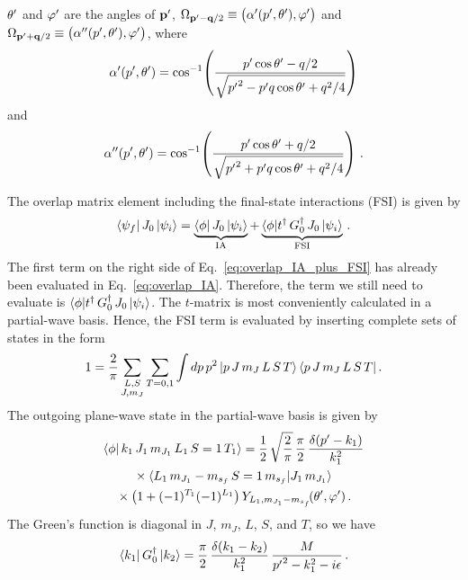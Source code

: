 	$\theta^{\prime}$ and $\varphi^{\prime}$ are the angles of $\mathbf{p^\prime}$, $\Omega_{\mathbf{p^\prime} -
	\mathbf{q}/2} \equiv \big(\alpha^\prime(p^\prime, \theta^{\prime} ), \varphi^{\prime} \big)$
	and $\Omega_{\mathbf{p^\prime} + \mathbf{q}/2} \equiv
	\big(\alpha^{\prime \prime}(p^\prime, \theta^{\prime}),
	\varphi^{\prime} \big)$, where
	\begin{equation}
	 \alpha^\prime (p^\prime, \theta^{\prime}) = \cos^{-1}
	 \!\left(
	  \frac{p^\prime \cos \theta^{\prime} - q/2}{\sqrt{{p^\prime}^2 - p^\prime q \cos\theta^{\prime} + q^2/4}}
	 \right)
	\label{eq:theta_c_prime_def}
	\end{equation}
	and
	\begin{equation}
	 \alpha^{\prime \prime} (p^\prime, \theta^{\prime}) = \cos^{-1}
	 \!\left(
	  \frac{p^\prime \cos \theta^{\prime} + q/2}{\sqrt{{p^\prime}^2 + p^\prime q \cos\theta^{\prime} + q^2/4}}
	 \right) \,.
	\label{eq:theta_c_double_prime_def}
	\end{equation}

	The overlap matrix element including the final-state interactions (FSI) is
	given by
	\begin{equation}
	 \langle \psi_f| \, J_0 \,|\psi_i \rangle
	 = \underbrace{\langle \phi| \, J_0 \,|\psi_i \rangle}_{\rm IA}
	 + \underbrace{\langle \phi| t^\dag \, G_0^\dag\, J_0 \,|\psi_i \rangle}_
	 {\rm FSI} \,.
	\label{eq:overlap_IA_plus_FSI}
	\end{equation}
	The first term on the right side of Eq.~\eqref{eq:overlap_IA_plus_FSI}
	has already been evaluated in Eq.~\eqref{eq:overlap_IA}.  Therefore, the term
	we still need to evaluate is $\langle \phi| t^\dag \, G_0^\dag\, J_0
	\,|\psi_i \rangle$.  The $t$-matrix is most conveniently calculated in a
	partial-wave basis.  Hence, the FSI term is evaluated by inserting complete
	sets of states in the form
	\begin{equation}
	 1 = \frac{2}{\pi} \sum_{\substack{L, S \\ J,  m_J }}
	 \sum_{T = 0, 1} \int dp \,p^2 \, |p \, J \, m_J \, L \, S \, T \rangle
	 \, \langle p \, J\, m_J \, L \, S \, T | \,.
	\label{eq:completeness_partial_wave}
	\end{equation}
	The outgoing plane-wave state in the partial-wave basis is given by
	\begin{multline}
	 \la \phi | \, k_1 \, J_1 \, m_{J_1} \, L_1 \, S = 1 \, T_1 \ra
	  =  \frac{1}{2} \, {\sqrt\frac{2}{\pi}} \, \frac{\pi}{2} \,
	 \frac{\delta(\pp - k_1)}{k_1 ^2}
	  \\
	  \null\times
	 \CG{L_1}{m_{J_1} - \msf}{S=1}{\msf}{J_1}{m_{J_1}}
	 \, \\
	 \null \times \big(1 + (-1)^{T_1} (-1)^{L_1}\big)
	 \,Y_{L_1,m_{J_1} - \msf}\!(\thetacm, \phicm) \,.
	\label{eq:phi_def_pw}
	\end{multline}
	The Green's
	function is diagonal in $J$, $m_J$, $L$, $S$, and $T$, so we have
	\begin{equation}
	 \langle k_1 | \, G_0^\dag \,| k_2 \rangle
	 = \frac{\pi}{2} \, \frac{\delta(k_1 - k_2)}{k_1^2}
	 \, \frac{M}{{p^\prime}^2 - k_1 ^2 - i\epsilon} \,.
	\label{eq:G0_def_pw}
	\end{equation}


